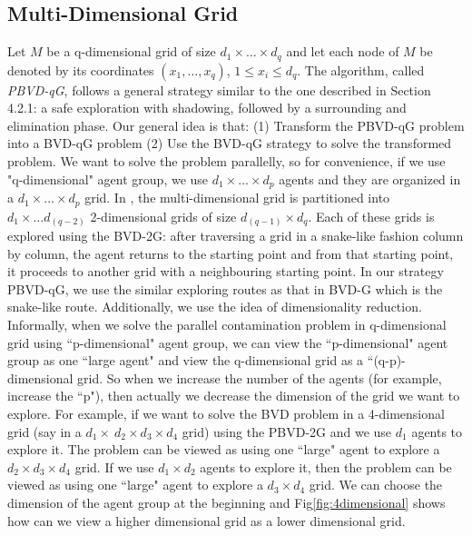 \subsection{Multi-Dimensional Grid}
Let $M$ be a q-dimensional grid of size $d_1\times\ldots\times d_q$ and let each node of $M$ be denoted by its coordinates $(x_1,\ldots,x_q)$, $1\leq x_i\leq d_q$. The algorithm, called {\em PBVD-qG}, follows a general strategy similar to the one described in Section 4.2.1: a safe exploration with shadowing, followed by a surrounding and elimination phase. Our general idea is that: (1) Transform the PBVD-qG problem into a BVD-qG problem (2) Use the BVD-qG strategy to solve the transformed problem. We want to solve the problem parallelly, so for convenience, if we use "q-dimensional" agent group, we use $d_1\times \ldots \times d_p$ agents and they are organized in a $d_1\times \ldots \times d_p$ grid. 
In \cite{Cai}, the multi-dimensional grid is partitioned into $d_1\times \ldots d_(q-2)$ 2-dimensional grids of size $d_(q-1) \times d_q$. Each of these grids is explored using the BVD-2G: after traversing a grid in a snake-like fashion column by column, the agent returns to the starting point and from that starting point, it proceeds to another grid with a neighbouring starting point. In our strategy PBVD-qG, we use the similar exploring routes as that in BVD-G which is the snake-like route. Additionally, we use the idea of dimensionality reduction. Informally, when we solve the parallel contamination problem in q-dimensional grid using ``p-dimensional" agent group, we can view the ``p-dimensional" agent group as one ``large agent" and view the q-dimensional grid as a ``(q-p)-dimensional grid. So when we increase the number of the agents (for example, increase the ``p"), then actually we decrease the dimension of the grid we want to explore. For example, if we want to solve the BVD problem in a 4-dimensional grid (say in a $d_1 \times\ d_2 \times d_3\times d_4$ grid) using the PBVD-2G and we use $d_1$ agents to explore it. The problem can be viewed as using one ``large" agent to explore a $d_2\times d_3\times d_4$ grid. If we use $d_1\times d_2$ agents to explore it, then the problem can be viewed as using one ``large" agent to explore a $d_3 \times d_4$ grid. We can choose the dimension of the agent group at the beginning and Fig\ref{fig:4dimensional} shows how can we view a higher dimensional grid as a lower dimensional grid. 

